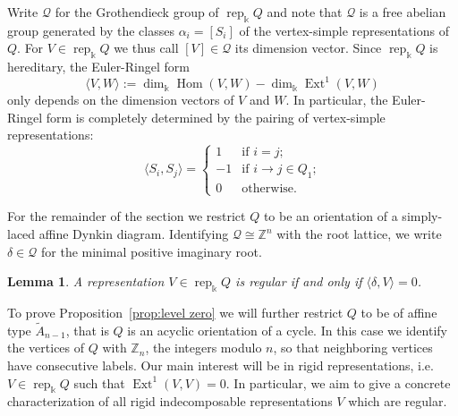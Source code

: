 \documentclass[12pt]{amsart}
\newcommand{\ZZ}{\mathbb{Z}}
\newcommand{\kk}{\Bbbk}%
\newcommand{\cQ}{\mathcal{Q}}
\newcommand{\rep}{\operatorname{rep}}
\DeclareMathOperator{\Ext}{Ext}
\DeclareMathOperator{\Hom}{Hom}
\newtheorem{lemma}[theorem]{Lemma}
\theoremstyle{remark}
\numberwithin{equation}{section}
\begin{document}
Write $\cQ$ for the Grothendieck group of $\rep_\kk Q$ and note that $\cQ$ is a free abelian group generated by the classes $\alpha_i=[S_i]$ of the vertex-simple representations of $Q$.  
For $V\in\rep_\kk Q$ we thus call $[V]\in\cQ$ its dimension vector.  
Since $\rep_\kk Q$ is hereditary, the Euler-Ringel form \[\langle V,W\rangle:=\dim_\kk\Hom(V,W)-\dim_\kk\Ext^1(V,W)\] only depends on the dimension vectors of $V$ and $W$.  
In particular, the Euler-Ringel form is completely determined by the pairing of vertex-simple representations:
\[\langle S_i,S_j\rangle=\begin{cases}1 & \text{if $i=j$;}\\ -1 & \text{if $i\to j\in Q_1$;}\\ 0 & \text{otherwise.}\end{cases}\]

For the remainder of the section we restrict $Q$ to be an orientation of a simply-laced affine Dynkin diagram.
Identifying $\cQ\cong\ZZ^n$ with the root lattice, we write $\delta\in\cQ$ for the minimal positive imaginary root.
\begin{lemma}\cite{ASS06}
  A representation $V\in\rep_\kk Q$ is regular if and only if $\langle\delta,V\rangle=0$.
\end{lemma}

To prove Proposition~\ref{prop:level zero} we will further restrict $Q$ to be of affine type $\tilde{A}_{n-1}$, that is $Q$ is an acyclic orientation of a cycle.  
In this case we identify the vertices of $Q$ with $\ZZ_n$, the integers modulo $n$, so that neighboring vertices have consecutive labels.
Our main interest will be in rigid representations, i.e. $V\in\rep_\kk Q$ such that $\Ext^1(V,V)=0$.  
In particular, we aim to give a concrete characterization of all rigid indecomposable representations $V$ which are regular.
\end{document}
